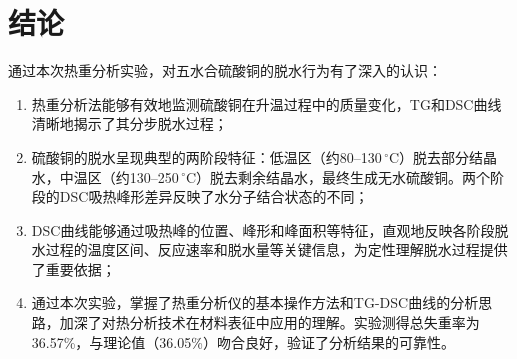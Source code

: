 \section{结\hspace{1em}论}

通过本次热重分析实验，对五水合硫酸铜的脱水行为有了深入的认识：

\begin{enumerate}[label=(\arabic*)]
    \item 热重分析法能够有效地监测硫酸铜在升温过程中的质量变化，TG和DSC曲线清晰地揭示了其分步脱水过程；
    \item 硫酸铜的脱水呈现典型的两阶段特征：低温区（约80--130\,$\mathrm{^\circ C}$）脱去部分结晶水，中温区（约130--250\,$\mathrm{^\circ C}$）脱去剩余结晶水，最终生成无水硫酸铜。两个阶段的DSC吸热峰形差异反映了水分子结合状态的不同；
    \item DSC曲线能够通过吸热峰的位置、峰形和峰面积等特征，直观地反映各阶段脱水过程的温度区间、反应速率和脱水量等关键信息，为定性理解脱水过程提供了重要依据；
    \item 通过本次实验，掌握了热重分析仪的基本操作方法和TG-DSC曲线的分析思路，加深了对热分析技术在材料表征中应用的理解。实验测得总失重率为36.57\%，与理论值（36.05\%）吻合良好，验证了分析结果的可靠性。
\end{enumerate}